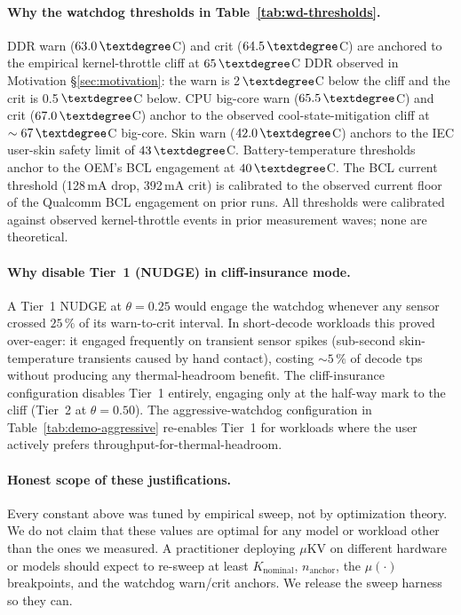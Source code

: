 \documentclass[sigconf, anonymous=false, screen=true]{acmart}
\begin{document}
\paragraph{Why the watchdog thresholds in Table~\ref{tab:wd-thresholds}.}
DDR warn ($63.0\,\textdegree$C) and crit ($64.5\,\textdegree$C) are anchored to the empirical kernel-throttle cliff at $65\,\textdegree$C DDR observed in Motivation §\ref{sec:motivation}: the warn is 2\,$\textdegree$C below the cliff and the crit is 0.5\,$\textdegree$C below. CPU big-core warn ($65.5\,\textdegree$C) and crit ($67.0\,\textdegree$C) anchor to the observed cool-state-mitigation cliff at $\sim 67\,\textdegree$C big-core. Skin warn ($42.0\,\textdegree$C) anchors to the IEC user-skin safety limit of $43\,\textdegree$C. Battery-temperature thresholds anchor to the OEM's BCL engagement at $40\,\textdegree$C. The BCL current threshold (128\,mA drop, 392\,mA crit) is calibrated to the observed current floor of the Qualcomm BCL engagement on prior runs. All thresholds were calibrated against observed kernel-throttle events in prior measurement waves; none are theoretical.

\paragraph{Why disable Tier~1 (NUDGE) in cliff-insurance mode.}
A Tier~1 NUDGE at $\theta = 0.25$ would engage the watchdog whenever any sensor crossed $25\,\%$ of its warn-to-crit interval. In short-decode workloads this proved over-eager: it engaged frequently on transient sensor spikes (sub-second skin-temperature transients caused by hand contact), costing $\sim 5\,\%$ of decode tps without producing any thermal-headroom benefit. The cliff-insurance configuration disables Tier~1 entirely, engaging only at the half-way mark to the cliff (Tier~2 at $\theta = 0.50$). The aggressive-watchdog configuration in Table~\ref{tab:demo-aggressive} re-enables Tier~1 for workloads where the user actively prefers throughput-for-thermal-headroom.

\paragraph{Honest scope of these justifications.} Every constant above was tuned by empirical sweep, not by optimization theory. We do not claim that these values are optimal for any model or workload other than the ones we measured. A practitioner deploying \textsc{$\mu$KV} on different hardware or models should expect to re-sweep at least $K_{\text{nominal}}$, $n_{\text{anchor}}$, the $\mu(\cdot)$ breakpoints, and the watchdog warn/crit anchors. We release the sweep harness so they can.
\end{document}
